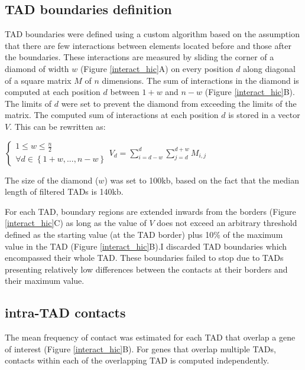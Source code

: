 \documentclass[11pt,a4paper]{report}
\begin{document}
\subsection*{TAD boundaries definition}

TAD boundaries were defined using a custom algorithm based on the assumption that there are few interactions between elements located before and those after the boundaries. These interactions are measured by sliding the corner of a diamond of width $w$ (Figure \ref{interact_hic}A) on every position $d$ along diagonal of a square matrix $M$ of $n$ dimensions. The sum of interactions in the diamond is computed at each position $d$ between $1+w$ and $n-w$ (Figure \ref{interact_hic}B). The limits of $d$ were set to prevent the diamond from exceeding the limits of the matrix. The computed sum of interactions at each position $d$ is stored in a vector $V$. This can be rewritten as: 

\vspace{0.2in}
$\left\{\begin{matrix}1\leq w\leq \frac{n}{2} \\ \forall d\in\left \{ 1+w , ... , n-w \right \}\end{matrix}\right. V_{d}=\sum_{i=d-w}^{d}\sum_{j=d}^{d+w}M_{i,j}$
\vspace{0.2in}

\noindent The size of the diamond ($w$) was set to 100kb, based on the fact that the median length of filtered TADs is 140kb.

For each TAD, boundary regions are extended inwards from the borders (Figure \ref{interact_hic}C) as long as the value of $V$ does not exceed an arbitrary threshold defined as the starting value (at the TAD border) plus 10\% of the maximum value in the TAD (Figure \ref{interact_hic}B).I discarded TAD boundaries which encompassed their whole TAD. These boundaries failed to stop due to TADs presenting relatively low differences between the contacts at their borders and their maximum value.

\subsection*{intra-TAD contacts}

The mean frequency of contact was estimated for each TAD that overlap a gene of interest (Figure \ref{interact_hic}B). For genes that overlap multiple TADs, contacts within each of the overlapping TAD is computed independently.
\end{document}
